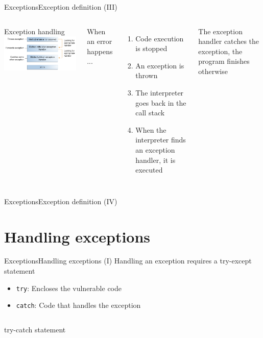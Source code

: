\documentclass[10pt,compress]{beamer} %
\begin{document}
\begin{frame}{Exceptions}{Exception definition (III)}
    \begin{columns}
		\centering Exception handling
		\includegraphics[width=0.8\linewidth]{figs/exceptions-errorOccurs.png}

		When an error happens ...
		\begin{enumerate}
		\item Code execution is stopped
		\item An exception is thrown
		\item The interpreter goes back in the call stack
		\item When the interpreter finds an exception handler, it is executed
		\end{enumerate}
		The exception handler catches the exception, the program finishes otherwise
	\end{columns}
\end{frame}

\begin{frame}{Exceptions}{Exception definition (IV)}
	
\end{frame}

\section{Handling exceptions}
\begin{frame}{Exceptions}{Handling exceptions (I)}
	Handling an exception requires a try-except statement
	\begin{itemize}
		\item \texttt{try}: Encloses the vulnerable code
		\item \texttt{catch}: Code that handles the exception
	\end{itemize}

    \begin{columns}
	\begin{block}{try-catch statement}
	\vspace{-0.2cm}
		
	\vspace{-0.2cm}
	\end{block}
	\end{columns}
\end{frame}
\end{document}
